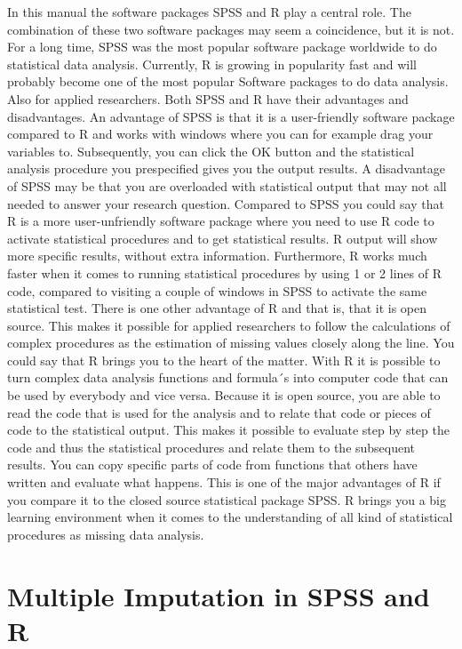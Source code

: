 \documentclass[]{book}
\begin{document}
In this manual the software packages SPSS and R play a central role. The
combination of these two software packages may seem a coincidence, but
it is not. For a long time, SPSS was the most popular software package
worldwide to do statistical data analysis. Currently, R is growing in
popularity fast and will probably become one of the most popular
Software packages to do data analysis. Also for applied researchers.
Both SPSS and R have their advantages and disadvantages. An advantage of
SPSS is that it is a user-friendly software package compared to R and
works with windows where you can for example drag your variables to.
Subsequently, you can click the OK button and the statistical analysis
procedure you prespecified gives you the output results. A disadvantage
of SPSS may be that you are overloaded with statistical output that may
not all needed to answer your research question. Compared to SPSS you
could say that R is a more user-unfriendly software package where you
need to use R code to activate statistical procedures and to get
statistical results. R output will show more specific results, without
extra information. Furthermore, R works much faster when it comes to
running statistical procedures by using 1 or 2 lines of R code, compared
to visiting a couple of windows in SPSS to activate the same statistical
test. There is one other advantage of R and that is, that it is open
source. This makes it possible for applied researchers to follow the
calculations of complex procedures as the estimation of missing values
closely along the line. You could say that R brings you to the heart of
the matter. With R it is possible to turn complex data analysis
functions and formula´s into computer code that can be used by everybody
and vice versa. Because it is open source, you are able to read the code
that is used for the analysis and to relate that code or pieces of code
to the statistical output. This makes it possible to evaluate step by
step the code and thus the statistical procedures and relate them to the
subsequent results. You can copy specific parts of code from functions
that others have written and evaluate what happens. This is one of the
major advantages of R if you compare it to the closed source statistical
package SPSS. R brings you a big learning environment when it comes to
the understanding of all kind of statistical procedures as missing data
analysis.

\section{Multiple Imputation in SPSS and
R}\label{multiple-imputation-in-spss-and-r}
\end{document}
